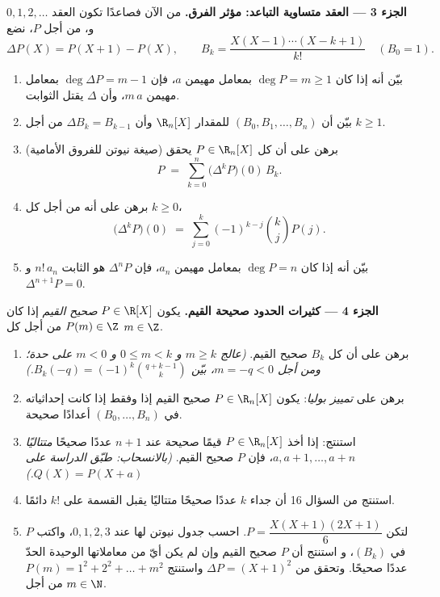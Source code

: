 \begin{problem}
\medskip
\noindent\textbf{الجزء 3 --- العقد متساوية التباعد: مؤثر
الفرق.} من الآن فصاعدًا تكون العقد $0, 1, 2, \dots$ و، من أجل
 $P$، نضع
\[
\Delta P(X) = P(X + 1) - P(X),
\qquad
B_k = \frac{X(X-1)\cdots(X-k+1)}{k!} \quad (B_0 = 1).
\]
\begin{enumerate}[resume]
  \item بيّن أنه إذا كان $\deg P = m \geq 1$ بمعامل مهيمن
        $a$، فإن $\deg \Delta P = m - 1$ بمعامل مهيمن
        $m\,a$، وأن $\Delta$ يقتل الثوابت.
  \item بيّن أن $(B_0, B_1, \dots, B_n)$  للمقدار
        $\R_n[X]$ وأن $\Delta B_k = B_{k-1}$ من أجل $k \geq 1$.
  \item (صيغة نيوتن للفروق الأمامية) برهن على أن كل $P
        \in \R_n[X]$ يحقق
        \[
        P \;=\; \sum_{k=0}^{n} \bigl(\Delta^{k} P\bigr)(0)\, B_k .
        \]
  \item برهن على أنه من أجل كل $k \geq 0$،
        \[
        \bigl(\Delta^{k} P\bigr)(0) \;=\;
        \sum_{j=0}^{k} (-1)^{k-j} \binom{k}{j} P(j) .
        \]
  \item بيّن أنه إذا كان $\deg P = n$ بمعامل مهيمن $a_n$،
        فإن $\Delta^{n} P$ هو الثابت $n!\,a_n$ و
        $\Delta^{n+1} P = 0$.
\end{enumerate}

\medskip
\noindent\textbf{الجزء 4 --- كثيرات الحدود صحيحة القيم.} يكون
 $P \in \R[X]$ \emph{صحيح القيم} إذا كان $P(m) \in
\Z$ من أجل كل $m \in \Z$.
\begin{enumerate}[resume]
  \item برهن على أن كل $B_k$ صحيح القيم. \emph{(عالج $m
        \geq k$ و $0 \leq m < k$ و $m < 0$ على حدة؛ ومن أجل $m =
        -q < 0$، بيّن $B_k(-q) = (-1)^k \binom{q + k - 1}{k}$.)}
  \item برهن على \emph{تمييز بوليا}: يكون $P \in \R_n[X]$
        صحيح القيم إذا وفقط إذا كانت إحداثياته في
         $(B_0, \dots, B_n)$ أعدادًا صحيحة.
  \item استنتج: إذا أخذ $P \in \R_n[X]$ قيمًا صحيحة عند $n + 1$
        عددًا صحيحًا \emph{متتاليًا} $a, a+1, \dots, a+n$، فإن $P$
        صحيح القيم. \emph{(بالانسحاب: طبّق الدراسة على $Q(X)
        = P(X + a)$.)}
  \item استنتج من السؤال 16 أن جداء $k$ عددًا صحيحًا
        متتاليًا يقبل القسمة على $k!$ دائمًا.
  \item لتكن $P = \dfrac{X(X+1)(2X+1)}{6}$. احسب جدول نيوتن لها
        عند $0, 1, 2, 3$، واكتب $P$ في  $(B_k)$، و
        استنتج أن $P$ صحيح القيم وإن لم يكن أيّ من معاملاتها
        الوحيدة الحدّ عددًا صحيحًا. وتحقق من $\Delta P =
        (X+1)^2$ واستنتج $P(m) = 1^2 + 2^2 + \dots + m^2$ من أجل
        $m \in \N$.
\end{enumerate}


\end{problem}
